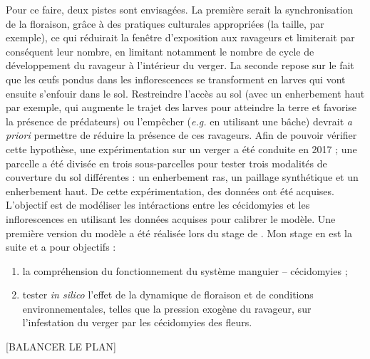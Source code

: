 Pour ce faire, deux pistes sont envisagées.
La première serait la synchronisation de la floraison, grâce à des pratiques culturales appropriées (la taille, par exemple), ce qui réduirait la fenêtre d'exposition aux ravageurs et limiterait par conséquent leur nombre, en limitant notamment le nombre de cycle de développement du ravageur à l'intérieur du verger.
La seconde repose sur le fait que les œufs pondus dans les inflorescences se transforment en larves qui vont ensuite s'enfouir dans le sol.
Restreindre l'accès au sol (avec un enherbement haut par exemple,  qui augmente le trajet des larves pour atteindre la terre et favorise la présence de prédateurs) ou l'empêcher (\emph{e.g.} en utilisant une bâche) devrait \emph{a priori} permettre de réduire la présence de ces ravageurs. 
Afin de pouvoir vérifier cette hypothèse, une expérimentation sur un verger a été conduite en 2017 ; une parcelle a été divisée en trois sous-parcelles pour tester trois modalités de couverture du sol différentes : un enherbement ras, un paillage synthétique et un enherbement haut. 
De cette expérimentation, des données ont été acquises.
L'objectif est de modéliser les intéractions  entre les cécidomyies et les inflorescences en utilisant les données acquises pour calibrer le modèle.
Une première version du modèle a été réalisée lors du stage de \citet{laurie}.
Mon stage en est la suite et a pour objectifs :
\begin{enumerate}
 \item la compréhension du fonctionnement du système manguier -- cécidomyies ;
 \item tester \emph{in silico} l'effet de la dynamique de floraison et de conditions environnementales, telles que la pression exogène du ravageur, sur l'infestation du verger par les cécidomyies des fleurs.
\end{enumerate}




[BALANCER LE PLAN]
